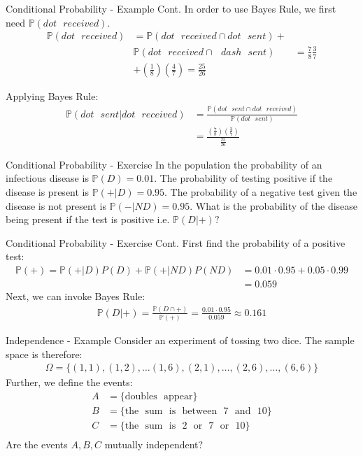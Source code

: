 \documentclass{beamer}
\begin{document}
\begin{frame}{Conditional Probability - Example Cont.}
In order to use Bayes Rule, we first need $\mathbb{P}(dot \>\>\> received)$.
\begin{align*}
\mathbb{P}(dot \>\>\> received) &= \mathbb{P}(dot \>\>\> received \cap dot \>\>\> sent) + \\ 
&\mathbb{P}(dot \>\>\> received \cap \>\>\> dash \>\>\> sent) &= \frac{7}{8}\frac{3}{7} \\
&+ \left(\frac{1}{8}\right)\left(\frac{4}{7}\right) = \frac{25}{26}
\end{align*}

Applying Bayes Rule:
\begin{align*}
\mathbb{P}(dot\>\>\> sent| dot \>\>\> received)  &= \frac{\mathbb{P}(dot \>\>\> sent \cap dot \>\>\> received)}{\mathbb{P}(dot \>\>\> sent)} \\
&= \frac{\left(\frac{7}{8}\right)\left(\frac{3}{7}\right)}{\frac{25}{26}}
\end{align*}
\end{frame}

\begin{frame}{Conditional Probability - Exercise}
In the population the probability of an infectious disease is $\mathbb{P}(D) = 0.01$. The probability of testing positive if the disease is present is $\mathbb{P}(+|D) = 0.95$. The probability of a negative test given the disease is not present is $\mathbb{P}(-|ND) = 0.95$. What is the probability of the disease being present if the test is positive i.e. $\mathbb{P}(D|+)?$
\end{frame}

\begin{frame}{Conditional Probability - Exercise Cont.}
First find the probability of a positive test:
\begin{align*}
\mathbb{P}(+) = \mathbb{P}(+|D)P(D) + \mathbb{P}(+|ND)P(ND) &= 0.01 \cdot 0.95 + 0.05 \cdot 0.99\\
 &= 0.059
\end{align*}
Next, we can invoke Bayes Rule:
\begin{align*}
\mathbb{P}(D|+) = \frac{\mathbb{P}(D \cap +)}{\mathbb{P}(+)} = \frac{0.01\cdot 0.95}{0.059} \approx 0.161
\end{align*}
\end{frame}

\begin{frame}{Independence - Example}
Consider an experiment of tossing two dice. The sample space is therefore:
\begin{align*}
\Omega = \{(1,1), (1,2),  \ldots (1,6), (2,1), \ldots, (2, 6), \ldots, (6,6)
\}
\end{align*}
Further, we define the events:
\begin{align*}
A &= \{\mathrm{doubles \>\>\> appear}\} \\
B &= \{\mathrm{the \>\>\> sum \>\>\> is \>\>\> between \>\>\> 7 \>\>\> and \>\>\> 10}\} \\
C &= \{\mathrm{the \>\>\> sum \>\>\> is \>\>\> 2 \>\>\> or \>\>\> 7 \>\>\> or \>\>\> 10}\} \\
\end{align*}
Are the events $A, B, C$ mutually independent?
\end{frame}
\end{document}

